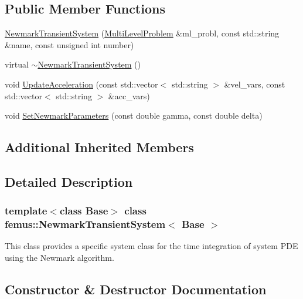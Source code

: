 \subsection*{Public Member Functions}
\begin{DoxyCompactItemize}
\item 
\mbox{\hyperlink{classfemus_1_1_newmark_transient_system_a1f5c4d4d233d8dc50719cd8d1384d97c}{Newmark\+Transient\+System}} (\mbox{\hyperlink{classfemus_1_1_multi_level_problem}{Multi\+Level\+Problem}} \&ml\+\_\+probl, const std\+::string \&name, const unsigned int number)
\item 
virtual \mbox{\hyperlink{classfemus_1_1_newmark_transient_system_aeed35f6e2cfb43ef24a79a39ab7a789c}{$\sim$\+Newmark\+Transient\+System}} ()
\item 
void \mbox{\hyperlink{classfemus_1_1_newmark_transient_system_a48a662cb269c1d3cedfe1840b467eee6}{Update\+Acceleration}} (const std\+::vector$<$ std\+::string $>$ \&vel\+\_\+vars, const std\+::vector$<$ std\+::string $>$ \&acc\+\_\+vars)
\item 
void \mbox{\hyperlink{classfemus_1_1_newmark_transient_system_a5fc2d316ab3e7e7b42222b1e2c1bff34}{Set\+Newmark\+Parameters}} (const double gamma, const double delta)
\end{DoxyCompactItemize}
\subsection*{Additional Inherited Members}


\subsection{Detailed Description}
\subsubsection*{template$<$class Base$>$\newline
class femus\+::\+Newmark\+Transient\+System$<$ Base $>$}

This class provides a specific system class for the time integration of system P\+DE using the Newmark algorithm. 

\subsection{Constructor \& Destructor Documentation}
\mbox{\label{classfemus_1_1_newmark_transient_system_a1f5c4d4d233d8dc50719cd8d1384d97c}} 
